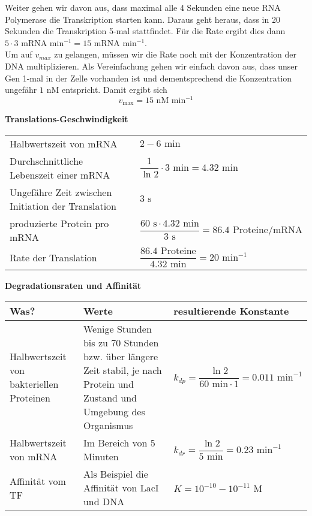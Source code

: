 \documentclass{article}
\begin{document}
Weiter gehen wir davon aus, dass maximal alle 4 Sekunden eine neue RNA Polymerase die Transkription starten kann. Daraus geht heraus, dass in 20 Sekunden die Transkription 5-mal stattfindet. Für die Rate ergibt dies dann $5\cdot 3\text{ mRNA min$^{-1}$}=15\text{ mRNA min$^{-1}$}$.\\
Um auf $v_{max}$ zu gelangen, müssen wir die Rate noch mit der Konzentration der DNA multiplizieren. Als Vereinfachung gehen wir einfach davon aus, dass unser Gen 1-mal in der Zelle vorhanden ist und dementsprechend die Konzentration ungefähr $1\text{ nM}$ entspricht. Damit ergibt sich
\[v_\text{max}=15\text{ nM min$^{-1}$}\]

\vspace{2em}

\textbf{Translations-Geschwindigkeit}

\begin{tabular}{p{.4\linewidth} p{.5\linewidth}}
    Halbwertszeit von mRNA & $2-6\text{ min}$ \\
    Durchschnittliche Lebenszeit einer mRNA & $\dfrac{1}{\ln2}\cdot 3\text{ min}=4.32\text{ min}$ \\
    Ungefähre Zeit zwischen Initiation der Translation & $3\text{ s}$ \\
    produzierte Protein pro mRNA & $\dfrac{60\text{ s}\cdot 4.32\text{ min}}{3\text{ s}}=86.4\text{ Proteine/mRNA}$ \\
    Rate der Translation & $\dfrac{86.4\text{ Proteine}}{4.32\text{ min}}=20\text{ min$^{-1}$}$
\end{tabular}

\vspace{2em}

\textbf{Degradationsraten und Affinität}

\begin{tabular}{p{.2\linewidth}|p{.4\linewidth}|p{.3\linewidth}}
    Was? & Werte & resultierende Konstante \\ \hline
     Halbwertszeit von bakteriellen Proteinen\cite{Koch1955-sx}\cite{Mandelstam1958-ne}\cite{Maurizi1992} & Wenige Stunden bis zu 70 Stunden bzw. über längere Zeit stabil, je nach Protein und Zustand und Umgebung des Organismus & $k_{dp}=\dfrac{\ln2}{60\text{ min}\cdot 1}=0.011\text{ min}^{-1}$ \\
     Halbwertszeit von mRNA\cite{Bernstein2002-af}\cite{Taniguchi2010-fj}\cite{Selinger2003-or} & Im Bereich von 5 Minuten & $k_{dr}=\dfrac{\ln2}{5\text{ min}}=0.23\text{ min}^{-1}$ \\
     Affinität vom TF & Als Beispiel die Affinität von LacI und DNA & $K=10^{-10}-10^{-11}\text{ M}$ \\
\end{tabular}
\end{document}
